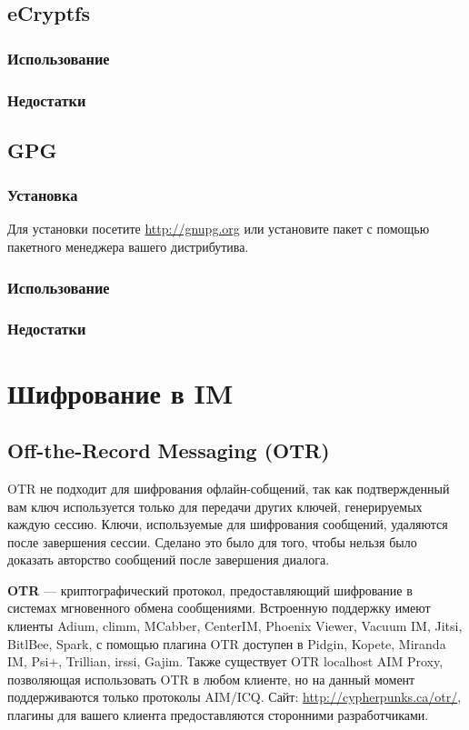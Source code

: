 \subsection{eCryptfs}
\subsubsection{Использование}
\subsubsection{Недостатки}
\subsection{GPG}
\subsubsection{Установка}
Для установки посетите \url{http://gnupg.org} или установите пакет с помощью пакетного менеджера вашего дистрибутива.
\subsubsection{Использование}
\subsubsection{Недостатки}

\section{Шифрование в IM}
\subsection{Off-the-Record Messaging (OTR)}
\begin{important}
OTR не подходит для шифрования офлайн-собщений, так как подтвержденный вам ключ используется только для передачи других ключей, генерируемых каждую сессию. Ключи, используемые для шифрования сообщений, удаляются после завершения сессии. Сделано это было для того, чтобы нельзя было доказать авторство сообщений после завершения диалога.
\end{important}
\textbf{OTR} --- криптографический протокол, предоставляющий шифрование в системах мгновенного обмена сообщениями. Встроенную поддержку имеют клиенты Adium, climm, MCabber, CenterIM, Phoenix Viewer, Vacuum IM, Jitsi, BitlBee, Spark, с помощью плагина OTR доступен в Pidgin\cite{otr-pidgin}, Kopete\cite{otr-kopete}, Miranda IM\cite{otr-miranda}, Psi+\cite{otr-psi}, Trillian\cite{otr-trillian}, irssi\cite{otr-irssi}, Gajim\cite{otr-gajim}. Также существует OTR localhost AIM Proxy, позволяющая использовать OTR в любом клиенте, но на данный момент поддерживаются только протоколы AIM/ICQ. Сайт: \url{http://cypherpunks.ca/otr/}, плагины для вашего клиента предоставляются сторонними разработчиками.
